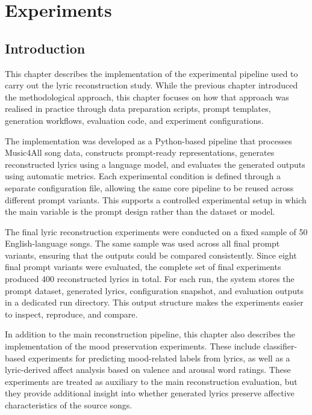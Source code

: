 \chapter{Experiments}

\section{Introduction}

This chapter describes the implementation of the experimental pipeline used to carry out the lyric reconstruction study. While the previous chapter introduced the methodological approach, this chapter focuses on how that approach was realised in practice through data preparation scripts, prompt templates, generation workflows, evaluation code, and experiment configurations.

The implementation was developed as a Python-based pipeline that processes Music4All song data, constructs prompt-ready representations, generates reconstructed lyrics using a language model, and evaluates the generated outputs using automatic metrics. Each experimental condition is defined through a separate configuration file, allowing the same core pipeline to be reused across different prompt variants. This supports a controlled experimental setup in which the main variable is the prompt design rather than the dataset or model.

The final lyric reconstruction experiments were conducted on a fixed sample of 50 English-language songs. The same sample was used across all final prompt variants, ensuring that the outputs could be compared consistently. Since eight final prompt variants were evaluated, the complete set of final experiments produced 400 reconstructed lyrics in total. For each run, the system stores the prompt dataset, generated lyrics, configuration snapshot, and evaluation outputs in a dedicated run directory. This output structure makes the experiments easier to inspect, reproduce, and compare.

In addition to the main reconstruction pipeline, this chapter also describes the implementation of the mood preservation experiments. These include classifier-based experiments for predicting mood-related labels from lyrics, as well as a lyric-derived affect analysis based on valence and arousal word ratings. These experiments are treated as auxiliary to the main reconstruction evaluation, but they provide additional insight into whether generated lyrics preserve affective characteristics of the source songs.

